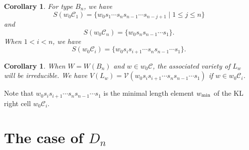 \documentclass[11pt, reqno]{amsart}
\newtheorem{cor}[Thm]{Corollary}
\theoremstyle{definition}
\numberwithin{equation}{section}
\begin{document}




\begin{cor}
    For type $B_n$, we have $$S(w_0\mathcal{C}_1)=\{w_0s_1\cdots s_ns_{n-1}\cdots s_{n-j+1}\mid 1\leq j\leq n\}$$ and  $$S(w_0\mathcal{C}_n)=\{w_0s_ns_{n-1}\cdots s_1\}.$$   When $1<i< n$, we have 
    $$S(w_0\mathcal{C}_i)=\{w_0s_is_{i+1}\cdots s_ns_{n-1}\cdots s_1\}.$$
\end{cor}

\begin{cor}
    When $W=W(B_n)$ and $w\in w_0\mathcal{C}$, the associated variety of $L_w$ will be irreducible. We have 
$V(L_w)=\mathcal{V}(w_0s_is_{i+1}\cdots s_ns_{n-1}\cdots s_1)$ if $w\in w_0\mathcal{C}_i$.
\end{cor}

Note that $w_0s_is_{i+1}\cdots s_ns_{n-1}\cdots s_{1}$ is the minimal length element $w_{\rm min} $
 of the KL right cell $w_0\mathcal{C}_i$.



\section{The case of $D_n$}\label{typed}
\end{document}
